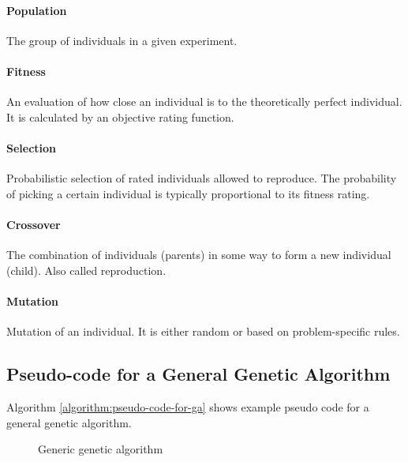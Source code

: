 \paragraph{Population}
The group of individuals in a given experiment.

\paragraph{Fitness}
An evaluation of how close an individual is to the theoretically perfect individual.
It is calculated by an objective rating function.

\paragraph{Selection}
Probabilistic selection of rated individuals allowed to reproduce.
The probability of picking a certain individual is typically proportional to its fitness rating.

\paragraph{Crossover}
The combination of individuals (parents) in some way to form a new individual (child).
Also called reproduction.

\paragraph{Mutation}
Mutation of an individual.
It is either random or based on problem-specific rules. 

\subsection{Pseudo-code for a General Genetic Algorithm}

Algorithm \vref{algorithm:pseudo-code-for-ga} shows example pseudo code for a general genetic algorithm.

\begin{figure}[H]
\begin{algorithm}[H]
\SetAlgoLined
\DontPrintSemicolon
{}
\caption{Generic genetic algorithm}
\label{algorithm:pseudo-code-for-ga}
\end{algorithm}
\end{figure}


